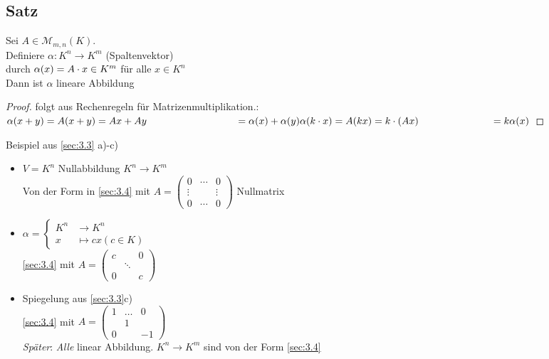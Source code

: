 \subsection{Satz}\label{sec:\thesubsection}
Sei $A \in \mathcal{M}_{m,n}(K)$.\\
Definiere $\alpha : K^n \to K^m$ (Spaltenvektor)\\
durch $\alpha(x) = A \cdot x \in K^m$ für alle $x \in K^n$\\
Dann ist $\alpha$ lineare Abbildung
\begin{proof}
folgt aus Rechenregeln für Matrizenmultiplikation.:\\
$\alpha(x+y) = A(x+y) =  Ax + Ay\\
\phantom{\alpha(x+y) = A(x+y)}= \alpha(x) + \alpha(y)\\
\alpha(k \cd x) = A(kx) = k \cd (Ax)\\
\phantom{\alpha(k \cd x) = A(kx)}= k \alpha(x)$
\end{proof}
Beispiel aus \ref{sec:3.3} a)-c)\\
\begin{itemize}
\item $V = K^n$ Nullabbildung $K^n \to K^m$\\
Von der Form in \ref{sec:3.4} mit $A = \begin{pmatrix}
0&\cdots&0\\
\vdots&&\vdots\\
0&\cdots&0
\end{pmatrix}$ Nullmatrix
\item $\alpha = \begin{cases}
K^n &\to K^n\\
x &\mapsto cx (c \in K)
\end{cases}$\\
\ref{sec:3.4} mit $ A = \begin{pmatrix}
c&&0\\
&\ddots&\\
0&&c
\end{pmatrix}$\\
\item Spiegelung aus \ref{sec:3.3}c)\\
\ref{sec:3.4} mit $A = \begin{pmatrix}
1&\ldots&0\\
&1&\\
0&&-1
\end{pmatrix}$\\
\emph{Später}: \emph{Alle} linear Abbildung. $K^n \to K^m$ sind von der Form \ref{sec:3.4}
\end{itemize}
